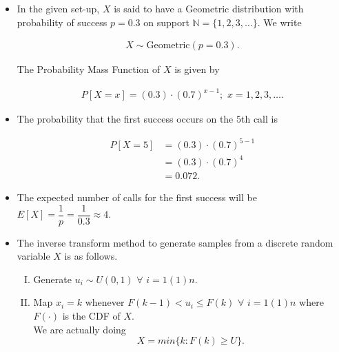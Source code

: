 \documentclass[11pt, a4paper]{article}\usepackage[]{graphicx}\usepackage[]{xcolor}
\begin{document}
\begin{itemize}
\item[\scalebox{2.0}{\twemoji{keycap: 1}}] \hspace{0.1cm} In the given set-up, $X$ is said to have a Geometric distribution with probability of success $p = 0.3$ on support $\mathbb{N} = \{1, 2, 3, \ldots\}$. We write

\begin{align*}
X \sim \text{Geometric}(p = 0.3).
\end{align*}

The Probability Mass Function of $X$ is given by

\begin{align*}
P[X = x] = (0.3) \cdot (0.7)^{x-1}; \,\, x = 1, 2, 3, \ldots.
\end{align*}

\item[\scalebox{2.0}{\twemoji{keycap: 2}}] \hspace{0.1cm} The probability that the first success occurs on the $5$th call is

\begin{align*}
P[X = 5] &= (0.3) \cdot (0.7)^{5-1} \\[0.3em]
&= (0.3) \cdot (0.7)^4 \\[0.3em]
&= 0.072.
\end{align*}

\item[\scalebox{2.0}{\twemoji{keycap: 3}}] \hspace{0.1cm} The expected number of calls for the first success will be $E[X] = \dfrac{1}{p} = \dfrac{1}{0.3} \approx 4$.

\item[\scalebox{2.0}{\twemoji{keycap: 4}}] \hspace{0.1cm} The inverse transform method to generate samples from a discrete random variable $X$ is as follows.
\begin{enumerate}[I.]
\item Generate $u_i \sim U(0, 1)$ $\forall$ $i = 1(1)n$.
\item Map $x_i = k$ whenever $F(k-1) < u_i \leq F(k)$ $\forall$ $i = 1(1)n$ where $F(\cdot)$ is the CDF of $X$. \\[0.35em] We are actually doing $$X = min\{k : F(k) \geq U\}.$$
\end{enumerate}

\end{itemize}

\newpage
\end{document}
